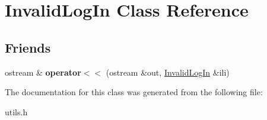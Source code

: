 \hypertarget{class_invalid_log_in}{}\section{Invalid\+Log\+In Class Reference}
\label{class_invalid_log_in}
\subsection*{Friends}
\begin{DoxyCompactItemize}
\item 
\hypertarget{class_invalid_log_in_a411d1f09f7d055dd9a8be918c5123fbd}{}\label{class_invalid_log_in_a411d1f09f7d055dd9a8be918c5123fbd} 
ostream \& {\bfseries operator$<$$<$} (ostream \&out, \hyperlink{class_invalid_log_in}{Invalid\+Log\+In} \&ili)
\end{DoxyCompactItemize}


The documentation for this class was generated from the following file\+:\begin{DoxyCompactItemize}
\item 
utils.\+h\end{DoxyCompactItemize}
